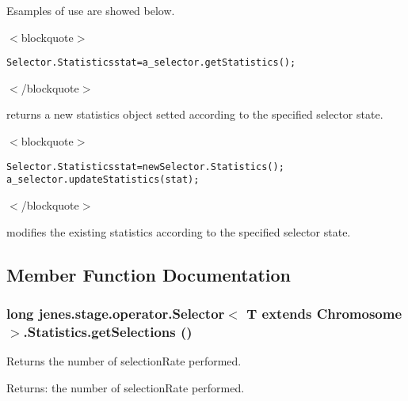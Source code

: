 Esamples of use are showed below. 

$<$blockquote$>$\small\begin{alltt}
 Selector.Statistics stat = a\_selector.getStatistics();
 \end{alltt}
\normalsize 
$<$/blockquote$>$ 

returns a new statistics object setted according to the specified selector state. 

$<$blockquote$>$\small\begin{alltt}
 Selector.Statistics stat = new Selector.Statistics();
 a\_selector.updateStatistics(stat);
 \end{alltt}
\normalsize 
$<$/blockquote$>$ 

modifies the existing statistics according to the specified selector state. 

\subsection{Member Function Documentation}
\hypertarget{classjenes_1_1stage_1_1operator_1_1_selector_3_01_t_01extends_01_chromosome_01_4_1_1_statistics_0145f6cec84ff007289d206f579a117a}{
\subsubsection[getSelections]{\setlength{\rightskip}{0pt plus 5cm}long jenes.stage.operator.Selector$<$ T extends Chromosome $>$.Statistics.getSelections ()}}
\label{classjenes_1_1stage_1_1operator_1_1_selector_3_01_t_01extends_01_chromosome_01_4_1_1_statistics_0145f6cec84ff007289d206f579a117a}


Returns the number of selectionRate performed.

\begin{Desc}
\item[Returns:]the number of selectionRate performed. \end{Desc}


